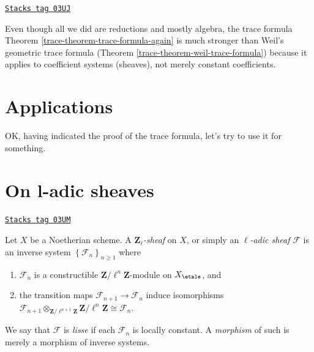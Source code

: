 \begin{remark}[Stronger]
\label{trace-remark-stronger}
\href{https://stacks.math.columbia.edu/tag/03UJ}{\texttt{Stacks tag 03UJ}}

Even though all we did are reductions and mostly algebra, the trace formula
Theorem \ref{trace-theorem-trace-formula-again} is much stronger than
Weil's geometric trace formula (Theorem \ref{trace-theorem-weil-trace-formula})
because it applies to coefficient
systems (sheaves), not merely constant coefficients.
\end{remark}



\section{Applications}
\label{trace-section-applications}
OK, having indicated the proof of the trace formula, let's try to use it
for something.

\section{On l-adic sheaves}
\label{trace-section-l-adic-sheaves}
\begin{definition}
\label{trace-definition-l-adic-sheaf}
\href{https://stacks.math.columbia.edu/tag/03UM}{\texttt{Stacks tag 03UM}}

Let $X$ be a Noetherian scheme. A {\it $\mathbf{Z}_\ell$-sheaf} on $X$, or
simply an {\it $\ell$-adic sheaf} $\mathcal{F}$ is an
inverse system $\left\{\mathcal{F}_n\right\}_{n\geq 1}$ where
\begin{enumerate}
\item
$\mathcal{F}_n$ is a constructible $\mathbf{Z}/\ell^n\mathbf{Z}$-module on
$X_\etale$, and
\item
the transition maps $\mathcal{F}_{n+1}\to \mathcal{F}_n$ induce isomorphisms
$\mathcal{F}_{n+1} \otimes_{\mathbf{Z}/\ell^{n+1}\mathbf{Z}}
\mathbf{Z}/\ell^n\mathbf{Z} \cong \mathcal{F}_n$.
\end{enumerate}
We say that $\mathcal{F}$ is {\it lisse} if each $\mathcal{F}_n$ is locally
constant. A {\it morphism} of such is merely a morphism of inverse systems.
\end{definition}

